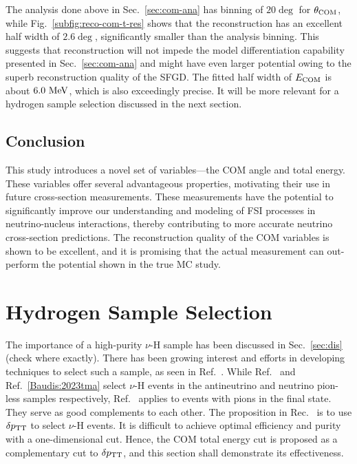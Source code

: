      The analysis done above in Sec.~\ref{sec:com-ana} has binning of $20\deg$ for $\theta_{\textrm{COM}}$, while Fig.~\ref{subfig:reco-com-t-res} shows that the reconstruction has an excellent half width of $2.6\deg$, significantly smaller than the analysis binning.
     This suggests that reconstruction will not impede the model differentiation capability presented in Sec.~\ref{sec:com-ana} and might have even larger potential owing to the superb reconstruction quality of the SFGD.
     The fitted half width of $E_{\textrm{COM}}$ is about $6.0~\textrm{MeV}$, which is also exceedingly precise.
     It will be more relevant for a hydrogen sample selection discussed in the next section. 
 
     \subsection{Conclusion}
     This study introduces a novel set of variables—the COM angle and total energy.
     These variables offer several advantageous properties, motivating their use in future cross-section measurements.
     These measurements have the potential to significantly improve our understanding and modeling of FSI processes in neutrino-nucleus interactions, thereby contributing to more accurate neutrino cross-section predictions.
     The reconstruction quality of the COM variables is shown to be excellent, and it is promising that the actual measurement can out-perform the potential shown in the true MC study.

\section{Hydrogen Sample Selection}
\label{sec:mc-hydrogen}
The importance of a high-purity $\nu$-H sample has been discussed in Sec.~\ref{sec:dis} (check where exactly).
There has been growing interest and efforts in developing techniques to select such a sample, as seen in Ref.~\cite{Lu:2015hea,MINERvA:2023avz,Baudis:2023tma}.
While Ref.~\cite{MINERvA:2023avz} and Ref.~\ref{Baudis:2023tma} select $\nu$-H events in the antineutrino and neutrino pion-less samples respectively, Ref.~\cite{Lu:2015hea} applies to events with pions in the final state. 
They serve as good complements to each other.
The proposition in Rec.~\cite{Lu:2015} is to use $\delta p_\textrm{TT}$ to select $\nu$-H events.
It is difficult to achieve optimal efficiency and purity with a one-dimensional cut. 
Hence, the COM total energy cut is proposed as a complementary cut to $\delta p_\textrm{TT}$, and this section shall demonstrate its effectiveness.

